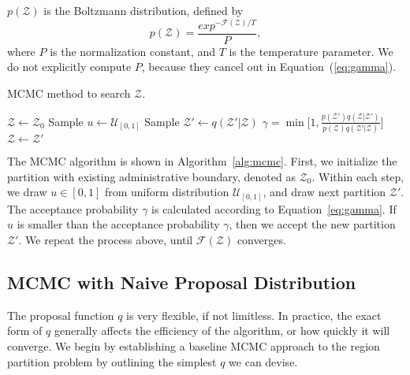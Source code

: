 $p(\mathcal{Z})$ is the Boltzmann distribution, defined by
\begin{equation}
p(\mathcal{Z}) = \frac{exp^{-\mathcal{F}(\mathcal{Z})/T}}{P}, 
\label{eq:boltzmann}
\end{equation}
where $P$ is the normalization constant, and $T$ is the temperature parameter. We do not explicitly compute $P$, because they cancel out in Equation~(\ref{eq:gamma}).

\begin{algorithm}
\caption{MCMC method to search $\mathcal{Z}$.}
\label{alg:mcmc}
\begin{algorithmic}[1]
\State $\mathcal{Z} \gets \mathcal{Z}_0$
  \State Sample $u \gets \mathcal{U}_{[0,1]}$
  \State Sample $\mathcal{Z}' \gets q(\mathcal{Z}'|\mathcal{Z})$
  \State $\gamma = \min \Big [ 1, \frac{p(\mathcal{Z}')q(\mathcal{Z}| \mathcal{Z}')}{p(\mathcal{Z})q(\mathcal{Z}'|\mathcal{Z})} \Big ]$
    \State $\mathcal{Z} \gets \mathcal{Z}'$
  \EndIf
\EndWhile
\end{algorithmic}
\end{algorithm}

The MCMC algorithm is shown in Algorithm~\ref{alg:mcmc}. First, we initialize the partition with existing administrative boundary, denoted as $\mathcal{Z}_0$. Within each step, we draw $u \in [0,1]$ from uniform distribution $\mathcal{U}_{[0,1]}$, and draw next partition $\mathcal{Z}'$. The acceptance probability $\gamma$ is calculated according to Equation~\ref{eq:gamma}. If $u$ is smaller than the acceptance probability $\gamma$, then we accept the new partition $\mathcal{Z}'$. We repeat the process above, until $\mathcal{F}(\mathcal{Z})$ converges.



\subsection{MCMC with Naive Proposal Distribution}

The proposal function $q$ is very flexible, if not limitless. In practice, the exact form of $q$ generally affects the efficiency of the algorithm, or how quickly it will converge. We begin by establishing a baseline MCMC approach to the region partition problem by outlining the simplest $q$ we can devise. 

